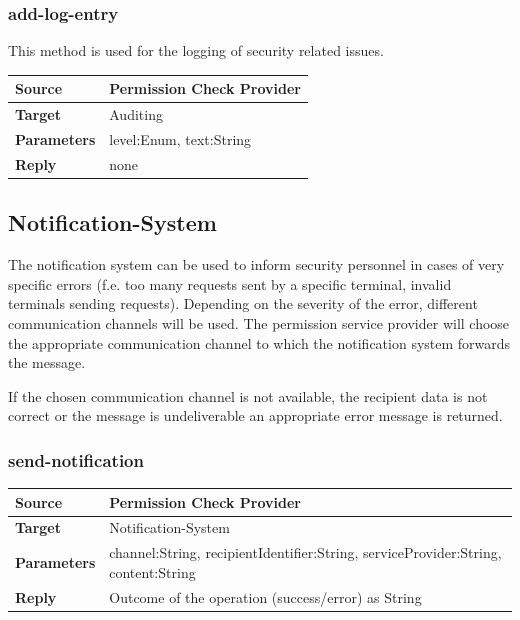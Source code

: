 \documentclass[12pt,a4paper,titlepage,oneside]{scrartcl}
\begin{document}
\subsubsection{add-log-entry}
This method is used for the logging of security related issues.

\begin{table}[h]
    \centering
    \begin{tabular}{|l|p{12cm}|} \hline
    \textbf{Source}&Permission Check Provider\\ \hline
    \textbf{Target}&Auditing\\ \hline
    \textbf{Parameters}&level:Enum, text:String\\ \hline
    \textbf{Reply}&none\\ \hline
    \end{tabular}
\end{table}

\subsection{Notification-System}
The notification system can be used to inform security personnel in cases of very specific errors (f.e. too many requests sent by a specific terminal, invalid terminals sending requests). Depending on the severity of the error, different communication channels will be used. The permission service provider will choose the appropriate communication channel to which the notification system forwards the message.

If the chosen communication channel is not available, the recipient data is not correct or the message is undeliverable an appropriate error message is returned.

\subsubsection{send-notification}
\begin{table}[h]
    \centering
    \begin{tabular}{|l|p{12cm}|} \hline
    \textbf{Source}&Permission Check Provider\\ \hline
    \textbf{Target}&Notification-System\\ \hline
    \textbf{Parameters}&channel:String, recipientIdentifier:String, serviceProvider:String, content:String\\ \hline
    \textbf{Reply}&Outcome of the operation (success/error) as String\\ \hline
    \end{tabular}
\end{table}
\end{document}
